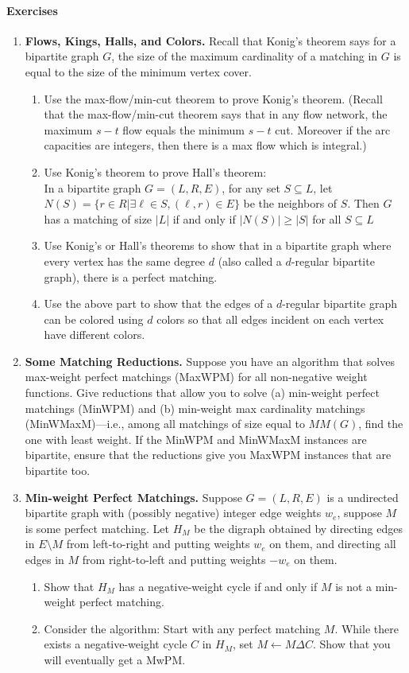 \documentclass{article}
\theoremstyle{plain}
\newcommand\litem[1]{\item{\bfseries#1.\space}}
\begin{document}
\paragraph{Exercises}
\begin{enumerate}

\litem{Flows, Kings, Halls, and Colors} Recall that
  Konig's theorem says for a bipartite graph $G$, the size of the
  maximum cardinality of a matching in $G$ is equal to the size of the
  minimum vertex cover.
  \begin{enumerate}
  \item Use the max-flow/min-cut theorem to prove Konig's
    theorem. (Recall that the max-flow/min-cut theorem says that in
    any flow network, the maximum $s-t$ flow equals the minimum $s-t$
    cut. Moreover if the arc capacities are integers, then there is a
    max flow which is integral.)
\item Use Konig’s theorem to prove Hall's theorem:\\
In a bipartite graph $G = (L, R, E)$, for any set $S \subseteq L$, let $N(S) = \{r \in R | \exists \ell \in
S,(\ell, r) \in E\}$ be the neighbors of $S$. Then $G$ has a matching of size $|L|$ if and
only if $|N(S)| \geq |S|$ for all $S \subseteq L$
\item Use Konig's or Hall’s theorems to show that in a bipartite graph where every vertex has
  the same degree $d$ (also called a $d$-regular bipartite graph), there is a perfect matching.
  \item Use the above part to show that the edges of a $d$-regular bipartite graph can be colored
using $d$ colors so that all edges incident on each vertex have different colors.
\end{enumerate}

\litem{Some Matching Reductions} Suppose you have an algorithm that solves max-weight
perfect matchings (MaxWPM) for all non-negative weight functions. Give reductions that
allow you to solve (a) min-weight perfect matchings (MinWPM) and (b) min-weight max cardinality
matchings (MinWMaxM)—i.e., among all matchings of size equal to $MM(G)$, find
the one with least weight.
If the MinWPM and MinWMaxM instances are bipartite, ensure that the reductions give you
MaxWPM instances that are bipartite too.

\litem{ Min-weight Perfect Matchings} Suppose $G = (L, R, E)$ is a undirected bipartite graph
with (possibly negative) integer edge weights $w_e$, suppose $M$ is some perfect matching. Let
$H_M$ be the digraph obtained by directing edges in $E \setminus M$ from left-to-right and putting weights
$w_e$ on them, and directing all edges in $M$ from right-to-left and putting weights $-w_e$ on them.
\begin{enumerate}
  \item  Show that $H_M$ has a negative-weight cycle if and only if $M$ is not a min-weight perfect
    matching.
    \item  Consider the algorithm: Start with any perfect matching $M$. While there exists a
negative-weight cycle $C$ in $H_M$, set $M \gets  M \Delta C$. Show that you will eventually get a
MwPM.


\end{enumerate}
\end{enumerate}
\end{document}
